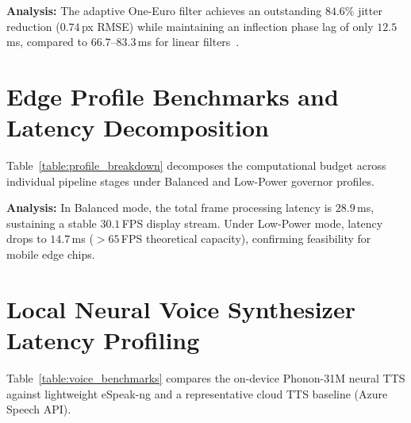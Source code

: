 \documentclass[12pt]{report}
\begin{document}
\textbf{Analysis:} The adaptive One-Euro filter achieves an outstanding $84.6\%$ jitter reduction ($0.74$\,px RMSE) while maintaining an inflection phase lag of only $12.5$\,ms, compared to $66.7\text{--}83.3$\,ms for linear filters~\cite{casiez2012euro}.

\section{Edge Profile Benchmarks and Latency Decomposition}
Table~\ref{table:profile_breakdown} decomposes the computational budget across individual pipeline stages under Balanced and Low-Power governor profiles.

\begin{table}[htbp]
    \centering
    \caption{Latency Breakdown by Profile}
    \label{table:profile_breakdown}
    \footnotesize
\end{table}

\textbf{Analysis:} In Balanced mode, the total frame processing latency is $28.9$\,ms, sustaining a stable $30.1$\,FPS display stream. Under Low-Power mode, latency drops to $14.7$\,ms ($>65$\,FPS theoretical capacity), confirming feasibility for mobile edge chips.

\section{Local Neural Voice Synthesizer Latency Profiling}
Table~\ref{table:voice_benchmarks} compares the on-device Phonon-31M neural TTS against lightweight eSpeak-ng and a representative cloud TTS baseline (Azure Speech API).
\end{document}
